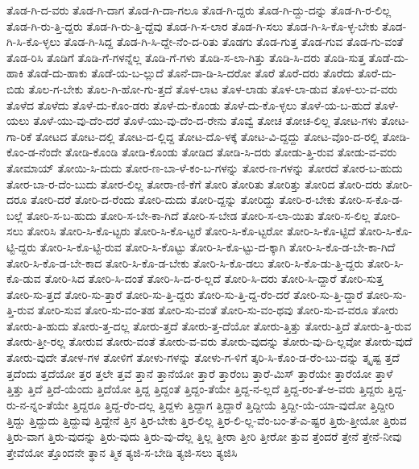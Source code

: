 {ತೊಡ-ಗಿ-ದ-ವರು
ತೊಡ-ಗಿ-ದಾಗ
ತೊಡ-ಗಿ-ದಾ-ಗಲೂ
ತೊಡ-ಗಿ-ದ್ದರು
ತೊಡ-ಗಿ-ದ್ದು-ದನ್ನು
ತೊಡ-ಗಿ-ರ-ಲಿಲ್ಲ
ತೊಡ-ಗಿ-ರು-ತ್ತಿ-ದ್ದರು
ತೊಡ-ಗಿ-ರು-ತ್ತಿ-ದ್ದೆವು
ತೊಡ-ಗಿ-ಸ-ಲಾರ
ತೊಡ-ಗಿ-ಸಲು
ತೊಡ-ಗಿ-ಸಿ-ಕೊ-ಳ್ಳ-ಬೇಕು
ತೊಡ-ಗಿ-ಸಿ-ಕೊ-ಳ್ಳಲು
ತೊಡ-ಗಿ-ಸಿದ್ದ
ತೊಡ-ಗಿ-ಸಿ-ದ್ದೇ-ನೆಂ-ದ-ರಿತು
ತೊಡಗು
ತೊಡ-ಗುತ್ತ
ತೊಡ-ಗುವ
ತೊಡ-ಗು-ವಂತೆ
ತೊಡ-ರಿಸಿ
ತೊಡಿಗೆ
ತೊಡಿ-ಗೆ-ಗಳನ್ನೆಲ್ಲ
ತೊಡಿ-ಗೆ-ಗಳು
ತೊಡಿ-ಸ-ಲಾ-ಗಿತ್ತು
ತೊಡಿ-ಸಿ-ದರು
ತೊಡಿ-ಸುತ್ತ
ತೊಡೆ-ದು-ಹಾಕಿ
ತೊಡೆ-ದು-ಹಾಕು
ತೊಡೆ-ಯ-ಬ-ಲ್ಲುದೆ
ತೊನೆ-ದಾ-ಡಿ-ಸಿ-ದರೋ
ತೊರೆ
ತೊರೆ-ದರು
ತೊರೆದು
ತೊರೆ-ದು-ಬಿಡು
ತೊಲ-ಗ-ಬೇಕು
ತೊಲ-ಗಿ-ಹೋ-ಗು-ತ್ತದೆ
ತೊಳ-ಲಾಟ
ತೊಳ-ಲಾಡು
ತೊಳ-ಲಾ-ಡುವ
ತೊಳ-ಲು-ವ-ವರು
ತೊಳೆದ
ತೊಳೆದು
ತೊಳೆ-ದು-ಕೊಂ-ಡರು
ತೊಳೆ-ದು-ಕೊಂಡು
ತೊಳೆ-ದು-ಕೊ-ಳ್ಳಲು
ತೊಳೆ-ಯ-ಬ-ಹುದೆ
ತೊಳೆ-ಯಲು
ತೊಳೆ-ಯು-ವು-ದೆಂ-ದರೆ
ತೊಳೆ-ಯು-ವು-ದೆಂ-ದ-ರೇನು
ತೊವ್ವೆ
ತೋಚ
ತೋಚ-ಲಿಲ್ಲ
ತೋಟ-ಗಳು
ತೋಟ-ಗಾ-ರಿಕೆ
ತೋಟದ
ತೋಟ-ದಲ್ಲಿ
ತೋಟ-ದ-ಲ್ಲಿದ್ದ
ತೋಟ-ದೊ-ಳಕ್ಕೆ
ತೋಟ-ವಿ-ದ್ದದ್ದು
ತೋಟ-ವೊಂ-ದ-ರಲ್ಲಿ
ತೋಡಿ-ಕೊಂ-ಡ-ನೆಂದೇ
ತೋಡಿ-ಕೊಂಡಿ
ತೋಡಿ-ಕೊಂಡು
ತೋಡಿದ
ತೋಡಿ-ಸಿ-ದರು
ತೋಡು-ತ್ತಿ-ರುವ
ತೋಡು-ವ-ವರು
ತೋಮಾಯ್
ತೋಯಿ-ಸಿ-ದುದು
ತೋರ-ಣ-ಬಾ-ಳೆ-ಕಂ-ಬ-ಗಳನ್ನು
ತೋರ-ಣ-ಗಳನ್ನು
ತೋರದೆ
ತೋರ-ಬ-ಹುದು
ತೋರ-ಬಾ-ರ-ದೆಂ-ಬುದು
ತೋರ-ಲಿಲ್ಲ
ತೋರಾ-ಣಿ-ಕೆಗೆ
ತೋರಿ
ತೋರಿತು
ತೋರಿತ್ತು
ತೋರಿದ
ತೋರಿ-ದರು
ತೋರಿ-ದರೂ
ತೋರಿ-ದರೆ
ತೋರಿ-ದ-ರೆಂದು
ತೋರಿ-ದುದು
ತೋರಿ-ದ್ದನ್ನು
ತೋರಿದ್ದು
ತೋರಿ-ರ-ಬೇಕು
ತೋರಿ-ಸ-ಕೊ-ಡ-ಬಲ್ಲೆ
ತೋರಿ-ಸ-ಬ-ಹುದು
ತೋರಿ-ಸ-ಬೇ-ಕಾ-ಗಿದೆ
ತೋರಿ-ಸ-ಬೇಡ
ತೋರಿ-ಸ-ಲಾ-ಯಿತು
ತೋರಿ-ಸ-ಲಿಲ್ಲ
ತೋರಿ-ಸಲು
ತೋರಿಸಿ
ತೋರಿ-ಸಿ-ಕೊ-ಟ್ಟರು
ತೋರಿ-ಸಿ-ಕೊ-ಟ್ಟರೆ
ತೋರಿ-ಸಿ-ಕೊ-ಟ್ಟರೋ
ತೋರಿ-ಸಿ-ಕೊ-ಟ್ಟಿದೆ
ತೋರಿ-ಸಿ-ಕೊ-ಟ್ಟಿ-ದ್ದರು
ತೋರಿ-ಸಿ-ಕೊ-ಟ್ಟಿ-ರುವ
ತೋರಿ-ಸಿ-ಕೊಟ್ಟು
ತೋರಿ-ಸಿ-ಕೊ-ಟ್ಟು-ದ-ಕ್ಕಾಗಿ
ತೋರಿ-ಸಿ-ಕೊ-ಡ-ಬೇ-ಕಾ-ಗಿದೆ
ತೋರಿ-ಸಿ-ಕೊ-ಡ-ಬೇ-ಕಾದ
ತೋರಿ-ಸಿ-ಕೊ-ಡ-ಬೇಕು
ತೋರಿ-ಸಿ-ಕೊ-ಡಲು
ತೋರಿ-ಸಿ-ಕೊ-ಡು-ತ್ತಿ-ದ್ದರು
ತೋರಿ-ಸಿ-ಕೊ-ಡುವ
ತೋರಿ-ಸಿದ
ತೋರಿ-ಸಿ-ದಂತೆ
ತೋರಿ-ಸಿ-ದ-ರ-ಲ್ಲದೆ
ತೋರಿ-ಸಿ-ದರು
ತೋರಿ-ಸಿ-ದ್ದಾರೆ
ತೋರಿ-ಸುತ್ತ
ತೋರಿ-ಸು-ತ್ತದೆ
ತೋರಿ-ಸು-ತ್ತಾರೆ
ತೋರಿ-ಸು-ತ್ತಿ-ದ್ದರು
ತೋರಿ-ಸು-ತ್ತಿ-ದ್ದ-ರೆಂ-ದರೆ
ತೋರಿ-ಸು-ತ್ತಿ-ದ್ದಾರೆ
ತೋರಿ-ಸು-ತ್ತಿ-ರುವ
ತೋರಿ-ಸುವ
ತೋರಿ-ಸು-ವಂ-ತಹ
ತೋರಿ-ಸು-ವಂತೆ
ತೋರಿ-ಸು-ವಂ-ಥವು
ತೋರಿ-ಸು-ವ-ವರೂ
ತೋರು
ತೋರು-ತಿ-ಹುದು
ತೋರು-ತ್ತ-ದಲ್ಲ
ತೋರು-ತ್ತದೆ
ತೋರು-ತ್ತ-ದೆಯೋ
ತೋರು-ತ್ತಿತ್ತು
ತೋರು-ತ್ತಿದೆ
ತೋರು-ತ್ತಿ-ರುವ
ತೋರು-ತ್ತೀ-ರಲ್ಲ
ತೋರುವ
ತೋರು-ವಂತೆ
ತೋರು-ವ-ವರು
ತೋರು-ವುದನ್ನು
ತೋರು-ವು-ದಿ-ಲ್ಲವೋ
ತೋರು-ವುದೆ
ತೋರು-ವುದೇ
ತೋಳ-ಗಳ
ತೋಳಿಗೆ
ತೋಳು-ಗಳನ್ನು
ತೋಳು-ಗ-ಳಿಗೆ
ತ್ಕರಿ-ಸಿ-ಕೊಂ-ಡ-ರೆಂ-ಬು-ದನ್ನು
ತ್ಕೃಷ್ಟ
ತ್ತದೆ
ತ್ತದೆಂದು
ತ್ತದೆಯೋ
ತ್ತರ
ತ್ತಲೇ
ತ್ತವೆ
ತ್ತಾನೆ
ತ್ತಾನೆಯೋ
ತ್ತಾರೆ
ತ್ತಾರೆಂಬ
ತ್ತಾರೆ-ಮಿಸ್
ತ್ತಾರೆಯೇ
ತ್ತಾರೆಯೋ
ತ್ತಾಳೆ
ತ್ತಿತ್ತು
ತ್ತಿದೆ
ತ್ತಿದೆ-ಯೆಂದು
ತ್ತಿದೆಯೋ
ತ್ತಿದ್ದ
ತ್ತಿದ್ದಂತೆ
ತ್ತಿದ್ದಂ-ತೆಯೇ
ತ್ತಿದ್ದ-ನ-ಲ್ಲದೆ
ತ್ತಿದ್ದ-ರಂ-ತೆ-ಅ-ವರು
ತ್ತಿದ್ದರು
ತ್ತಿದ್ದ-ರು-ನ-ನ್ನಂ-ತೆಯೇ
ತ್ತಿದ್ದರೂ
ತ್ತಿದ್ದ-ರೆಂ-ದಲ್ಲ
ತ್ತಿದ್ದಳು
ತ್ತಿದ್ದಾಗ
ತ್ತಿದ್ದಾರೆ
ತ್ತಿದ್ದೀಯೆ
ತ್ತಿದ್ದೀ-ಯೆ-ಯಾ-ವುದೋ
ತ್ತಿದ್ದೀರಿ
ತ್ತಿದ್ದು
ತ್ತಿದ್ದುದು
ತ್ತಿದ್ದುವು
ತ್ತಿದ್ದೇನೆ
ತ್ತಿನ
ತ್ತಿರ-ಬೇಕು
ತ್ತಿರ-ಲಿಲ್ಲ
ತ್ತಿರ-ಲಿ-ಲ್ಲ-ವೆಂ-ಬಂ-ತೆ-ಎ-ಷ್ಟರ
ತ್ತಿರು-ತ್ತೀಯೋ
ತ್ತಿರುವ
ತ್ತಿರು-ವಾಗ
ತ್ತಿರು-ವುದನ್ನು
ತ್ತಿರು-ವುದು
ತ್ತಿರು-ವು-ದೆಲ್ಲ
ತ್ತಿಲ್ಲ
ತ್ತೀರಾ
ತ್ತೀರಿ
ತ್ತೀರೋ
ತ್ತುವ
ತ್ತೆಂದರೆ
ತ್ತೇನೆ
ತ್ತೇನೆ-ನೀವು
ತ್ತೇವೆಯೋ
ತ್ತೊಂದನೇ
ತ್ಥಾನ
ತ್ಮಿಕ
ತ್ಯಜಿ-ಸ-ಬೇಡಿ
ತ್ಯಜಿ-ಸಲು
ತ್ಯಜಿಸಿ
}
